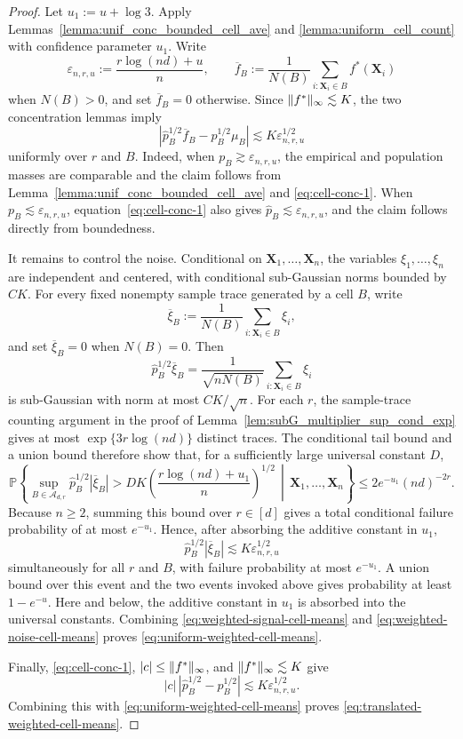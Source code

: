 \documentclass[11pt]{article}
\theoremstyle{plain}
\theoremstyle{definition}
\theoremstyle{remark}
\theoremstyle{plain}
\newcommand{\bX}{\mathbf{X}}
\DeclarePairedDelimiter{\norm}{\|}{\|}
\renewcommand{\P}{\mathbb{P}}
\newcommand{\1}{\mathbbm{1}}
\begin{document}
\begin{proof}
Let $u_1:=u+\log 3$.
Apply Lemmas~\ref{lemma:unif_conc_bounded_cell_ave} and
\ref{lemma:uniform_cell_count} with confidence parameter $u_1$. Write
\[
\varepsilon_{n,r,u}:=\frac{r\log(nd)+u}{n},
\qquad
\overline f_B:=\frac{1}{N(B)}\sum_{i:\bX_i\in B}f^*(\bX_i)
\]
when $N(B)>0$, and set $\overline f_B=0$ otherwise. Since
$\norm{f^*}_\infty\lesssim K$, the two concentration lemmas imply
\begin{equation}\label{eq:weighted-signal-cell-means}
\left|
\hat p_B^{1/2}\overline f_B-p_B^{1/2}\mu_B
\right|
\lesssim K\varepsilon_{n,r,u}^{1/2}
\end{equation}
uniformly over $r$ and $B$. Indeed, when
$p_B\gtrsim\varepsilon_{n,r,u}$, the empirical and population masses
are comparable and the claim follows from
Lemma~\ref{lemma:unif_conc_bounded_cell_ave} and
\eqref{eq:cell-conc-1}. When
$p_B\lesssim\varepsilon_{n,r,u}$, equation~\eqref{eq:cell-conc-1}
also gives $\hat p_B\lesssim\varepsilon_{n,r,u}$, and the claim follows
directly from boundedness.

It remains to control the noise. Conditional on
$\bX_1,\ldots,\bX_n$, the variables $\xi_1,\ldots,\xi_n$ are
independent and centered, with conditional sub-Gaussian norms bounded
by $CK$. For every fixed nonempty sample trace generated by a cell
$B$, write
\[
\overline\xi_B:=\frac{1}{N(B)}\sum_{i:\bX_i\in B}\xi_i,
\]
and set $\overline\xi_B=0$ when $N(B)=0$. Then
\[
\hat p_B^{1/2}\overline\xi_B
=
\frac{1}{\sqrt{nN(B)}}
\sum_{i:\bX_i\in B}\xi_i
\]
is sub-Gaussian with norm at most $CK/\sqrt n$. For each $r$, the
sample-trace counting argument in the proof of
Lemma~\ref{lem:subG_multiplier_sup_cond_exp} gives at most
$\exp\{3r\log(nd)\}$ distinct traces. The conditional tail bound and a
union bound therefore show that, for a sufficiently large universal
constant $D$,
\[
\P\left\{
\sup_{B\in\mathcal A_{d,r}}
\hat p_B^{1/2}|\overline\xi_B|
>
DK\left(\frac{r\log(nd)+u_1}{n}\right)^{1/2}
\,\middle|\,
\bX_1,\ldots,\bX_n
\right\}
\leq 2e^{-u_1}(nd)^{-2r}.
\]
Because $n\ge2$, summing this bound over $r\in[d]$ gives a total
conditional failure probability of at most $e^{-u_1}$. Hence,
after absorbing the additive constant in $u_1$,
\begin{equation}\label{eq:weighted-noise-cell-means}
\hat p_B^{1/2}|\overline\xi_B|
\lesssim K\varepsilon_{n,r,u}^{1/2}
\end{equation}
simultaneously for all $r$ and $B$, with failure probability at most
$e^{-u_1}$. A union bound over this event and the two events invoked
above gives probability at least $1-e^{-u}$. Here and below, the
additive constant in $u_1$ is absorbed into the universal constants.
Combining
\eqref{eq:weighted-signal-cell-means} and
\eqref{eq:weighted-noise-cell-means} proves
\eqref{eq:uniform-weighted-cell-means}.

Finally, \eqref{eq:cell-conc-1},
$|c|\leq\norm{f^*}_\infty$, and
$\norm{f^*}_\infty\lesssim K$ give
\[
|c|\,|\hat p_B^{1/2}-p_B^{1/2}|
\lesssim K\varepsilon_{n,r,u}^{1/2}.
\]
Combining this with \eqref{eq:uniform-weighted-cell-means} proves
\eqref{eq:translated-weighted-cell-means}.
\end{proof}
\end{document}

